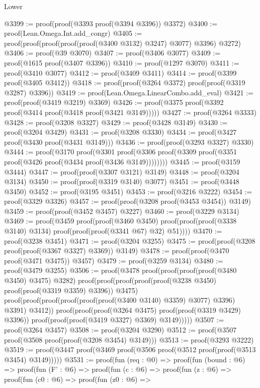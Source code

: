 \begin{lexlean}{Lower}
\begin{coremodule}
@3399 := proof(proof(@3393 proof(@3394 @3396)) @3372)
@3400 := proof(Lean.Omega.Int.add_congr)
@3405 := proof(proof(proof(proof(proof(@3400 @3132) @3247) @3077) @3396) @3272)
@3406 := proof(@39 @3070)
@3407 := proof(@3406 @3077)
@3409 := proof(@1615 proof(@3407 @3396))
@3410 := proof(@1297 @3070)
@3411 := proof(@3410 @3077)
@3412 := proof(@3409 @3411)
@3414 := proof(@3399 proof(@3405 @3412))
@3418 := proof(proof(@3264 @3372) proof(proof(@3319 @3287) @3396))
@3419 := proof(Lean.Omega.LinearCombo.add_eval)
@3421 := proof(proof(@3419 @3219) @3369)
@3426 := proof(@3375 proof(@3392 proof(@3414 proof(@3418 proof(@3421 @3149)))))
@3427 := proof(@3264 @3333)
@3428 := proof(@3208 @3327)
@3429 := proof(@3428 @3149)
@3430 := proof(@3204 @3429)
@3431 := proof(@3208 @3330)
@3434 := proof(@3427 proof(@3430 proof(@3431 @3149)))
@3436 := proof(proof(@3293 @3327) @3330)
@3444 := proof(@3170
      proof(@3301
          proof(@3306 proof(@3309 proof(@3351 proof(@3426 proof(@3434 proof(@3436 @3149))))))))
@3445 := proof(@3159 @3444)
@3447 := proof(proof(@3307 @3121) @3149)
@3448 := proof(@3204 @3134)
@3450 := proof(proof(@3319 @3140) @3077)
@3451 := proof(@3448 @3450)
@3452 := proof(@3195 @3451)
@3453 := proof(@3216 @3222)
@3454 := proof(@3329 @3326)
@3457 := proof(proof(@3208 proof(@3453 @3454)) @3149)
@3459 := proof(proof(@3452 @3457) @3227)
@3460 := proof(@3229 @3134)
@3469 := proof(@3459
      proof(proof(@3460 @3450)
          proof(proof(proof(@3338 @3140) @3134) proof(proof(proof(@3341 @67) @32) @51))))
@3470 := proof(@3238 @3451)
@3471 := proof(@3204 @3255)
@3475 := proof(proof(@3208 proof(proof(@3367 @3327) @3369)) @3149)
@3478 := proof(proof(@3470 proof(@3471 @3475)) @3457)
@3479 := proof(@3259 @3134)
@3480 := proof(@3479 @3255)
@3506 := proof(@3478
      proof(proof(proof(proof(@3480 @3450) @3475) @3282)
          proof(proof(proof(proof(proof(@3238 @3450) proof(proof(@3319 @3359) @3396)) @3475)
                proof(proof(proof(proof(proof(proof(@3400 @3140) @3359) @3077) @3396) @3391) @3412))
              proof(proof(proof(@3264 @3475) proof(proof(@3319 @3429) @3396))
                  proof(proof(proof(@3419 @3327) @3369) @3149)))))
@3507 := proof(@3264 @3457)
@3508 := proof(@3204 @3290)
@3512 := proof(@3507 proof(@3508 proof(proof(@3208 @3454) @3149)))
@3513 := proof(@3293 @3222)
@3519 := proof(@3447 proof(@3469 proof(@3506 proof(@3512 proof(proof(@3513 @3454) @3149)))))
@3531 := proof(fun (req : @0) =>
    proof(fun (bound : @6) =>
      proof(fun (F' : @6) =>
        proof(fun (c : @6) =>
          proof(fun (z : @6) =>
            proof(fun (c0 : @6) =>
              proof(fun (z0 : @6) =>

\end{coremodule}
\end{lexlean}
